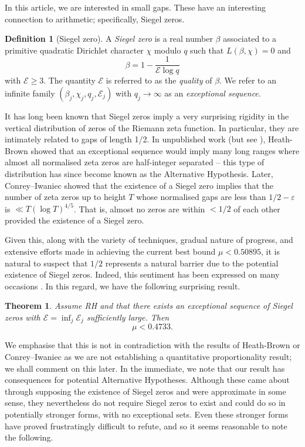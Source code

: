 \documentclass[12pt, oneside]{amsart}
\newtheorem{thm}{Theorem}
\theoremstyle{definition}
\newtheorem{defn}{Definition}
\newcommand{\mc}{\mathcal}
\newcommand{\geqs}{\geqslant }
\newcommand{\eps}{\varepsilon}
\newcommand{\1}{\mathds{1}}
\begin{document}
In this article, we are interested in small gaps. These have an interesting connection to arithmetic; specifically, Siegel zeros.   

\begin{defn}[Siegel zero] 
A \emph{Siegel zero} is a real number $\beta$ associated to a primitive quadratic Dirichlet character $\chi$ modulo $q$ such that $L(\beta,\chi)=0$ and 
\[
\beta= 1-\frac{1}{\mc{E}\log q}
\]
with $\mc{E}\geqs 3$. The quantity $\mc{E}$ is referred to as the \emph{quality} of $\beta$. We refer to an infinite family $(\beta_j,\chi_j,q_j,\mc{E}_j)$ with $q_j\to\infty$ as an \emph{exceptional sequence}.  
\end{defn}

It has long been known that Siegel zeros imply a very surprising rigidity in the vertical distribution of zeros of the Riemann zeta function. In particular, they are intimately related to gaps of length 1/2. In unpublished work (but see \cite{HBtalk}), Heath-Brown showed that an exceptional sequence would imply many long ranges where almost all normalised zeta zeros are half-integer separated -- this type of distribution has since become known as the Alternative Hypothesis. Later, Conrey--Iwaniec \cite{CI} showed that the existence of a Siegel zero implies that the number of zeta zeros up to height $T$ whose normalised gaps are less than $1/2-\eps$ is $\ll T(\log T)^{4/5}$. That is, almost no zeros are within $<1/2$ of each other provided the existence of a Siegel zero. 


Given this, along with the variety of techniques, gradual nature of progress, and extensive efforts made in achieving the current best bound $\mu<0.50895$, it is natural to suspect that $1/2$ represents a natural barrier due to the potential existence of Siegel zeros. Indeed, this sentiment has been expressed on many occasions \cite{C,GTTB, Inoue}. In this regard, we have the following surprising result.    

     

\begin{thm}
\label{main thm}
Assume RH and that there exists an exceptional sequence of Siegel zeros with $\mc{E}=\inf_j \mc{E}_j$ sufficiently large. Then
\[
\mu<0.4733.
\]
\end{thm}

We emphasise that this is not in contradiction with the results of Heath-Brown or Conrey--Iwaniec as we are not establishing a quantitative proportionality result; we shall comment on this later. In the immediate, we note that our result has consequences for potential Alternative Hypotheses. Although these came about through supposing the existence of Siegel zeros and were approximate in some sense, they nevertheless do not require Siegel zeros to exist and could do so in potentially stronger forms, with no exceptional sets. Even these stronger forms have proved frustratingly difficult to refute, and so it seems reasonable to note the following.     
\end{document}
